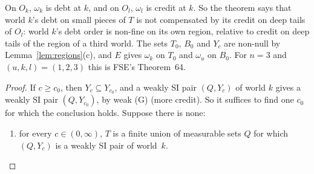 \documentclass[11pt]{article}
\theoremstyle{definition}\newtheorem{definition}[theorem]{Definition}
\theoremstyle{remark}\newtheorem{remark}[theorem]{Remark}
\begin{document}
On $O_k$, $\omega_k$ is debt at $k$, and on $O_l$, $\omega_l$ is credit at
$k$. So the theorem says that world $k$'s debt on small pieces of $T$ is
not compensated by its credit on deep tails of $O_l$: world $k$'s debt
order is non-fine on its own region, relative to credit on deep tails of
the region of a third world. The sets $T_0$, $B_0$ and $Y_c$ are non-null
by Lemma~\ref{lem:regions}(c), and $E$ gives $\omega_k$ on $T_0$ and
$\omega_u$ on $B_0$. For $n=3$ and $(u,k,l)=(1,2,3)$ this is FSE's
Theorem~64.

\begin{proof}
If $c\ge c_0$, then $Y_c\subseteq Y_{c_0}$, and a weakly SI pair $(Q,Y_c)$
of world $k$ gives a weakly SI pair $(Q,Y_{c_0})$, by weak (G) (more
credit). So it suffices to find one $c_0$ for which the conclusion holds.
Suppose there is none:
\begin{enumerate}[label=(M2$^*$),leftmargin=*]
\item for every $c\in(0,\infty)$, $T$ is a finite union of measurable sets
$Q$ for which $(Q,Y_c)$ is a weakly SI pair of world~$k$.
\end{enumerate}


\end{proof}
\end{document}
